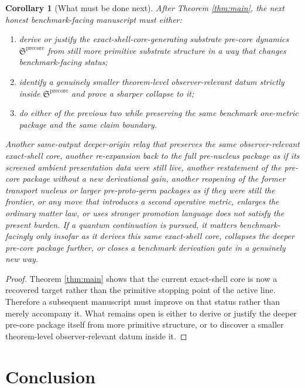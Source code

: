 \documentclass[11pt]{article}
\newcommand{\PreCorePackage}{\mathfrak S^{\mathrm{precore}}}
\newtheorem{corollary}{Corollary}
\begin{document}
\begin{corollary}[What must be done next]
\label{cor:next}
After Theorem \ref{thm:main}, the next honest benchmark-facing manuscript must either:
\begin{enumerate}
    \item derive or justify the exact-shell-core-generating substrate pre-core dynamics \(\PreCorePackage\) from still more primitive substrate structure in a way that changes benchmark-facing status;
    \item identify a genuinely smaller theorem-level observer-relevant datum strictly inside \(\PreCorePackage\) and prove a sharper collapse to it;
    \item do either of the previous two while preserving the same benchmark one-metric package and the same claim boundary.
\end{enumerate}
Another same-output deeper-origin relay that preserves the same observer-relevant exact-shell core, another re-expansion back to the full pre-nucleus package as if its screened ambient presentation data were still live, another restatement of the pre-core package without a new derivational gain, another reopening of the former transport nucleus or larger pre-proto-germ packages as if they were still the frontier, or any move that introduces a second operative metric, enlarges the ordinary matter law, or uses stronger promotion language does not satisfy the present burden. If a quantum continuation is pursued, it matters benchmark-facingly only insofar as it derives this same exact-shell core, collapses the deeper pre-core package further, or closes a benchmark derivation gate in a genuinely new way.
\end{corollary}

\begin{proof}
Theorem \ref{thm:main} shows that the current exact-shell core is now a recovered target rather than the primitive stopping point of the active line. Therefore a subsequent manuscript must improve on that status rather than merely accompany it. What remains open is either to derive or justify the deeper pre-core package itself from more primitive structure, or to discover a smaller theorem-level observer-relevant datum inside it.
\end{proof}

\section{Conclusion}
\end{document}
